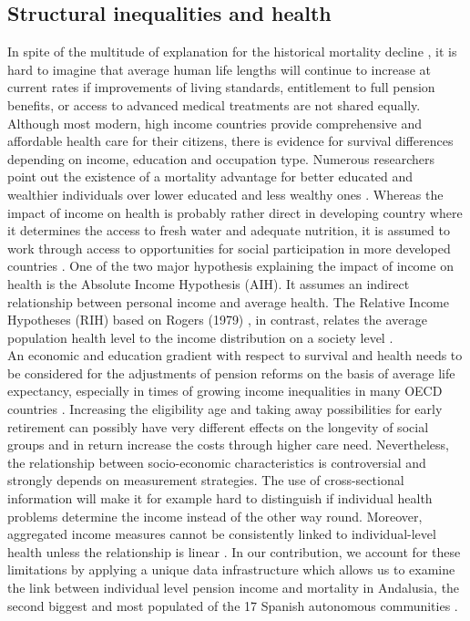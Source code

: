 \documentclass[a4paper,10pt,oneside,english]{article}
\begin{document}
\subsection*{\textsf{Structural inequalities and health}}
In spite of the multitude of explanation for the historical mortality decline \citep{riley2001rising}, it is hard to imagine that average human life lengths will continue to increase at current rates if improvements of living standards, entitlement to full pension benefits, or access to advanced medical treatments are not shared equally. Although most modern, high income countries provide comprehensive and affordable health care for their citizens, there is evidence for survival differences depending on income, education and occupation type. Numerous researchers point out the existence of a mortality advantage for better educated and wealthier individuals over lower educated and less wealthy ones  \cite{RN214,RN26,RN28,RN29,mackenbach2008socioeconomic,RN70}. Whereas the impact of income on health is probably rather direct in developing country where it determines the access to fresh water and adequate nutrition, it is assumed to work through access to opportunities for social participation in more developed countries \cite{RN35,RN39,RN41}. One of the two major hypothesis explaining the impact of income on health is the Absolute Income Hypothesis (AIH). It assumes an indirect relationship between personal income and average health. The Relative Income Hypotheses (RIH) based on Rogers (1979) \cite{rodgers1979income}, in contrast, relates the average population health level to the income distribution on a society level \citep{RN2}.\\
An economic and education gradient with respect to survival and health needs to be considered for the adjustments of pension reforms on the basis of average life expectancy, especially in times of growing income inequalities in many OECD countries \cite{RN74,corak2013income,RN47}. Increasing the eligibility age and taking away possibilities for early retirement can possibly have very different effects on the longevity of social groups and in return increase the costs through higher care need. Nevertheless, the relationship between socio-economic characteristics is controversial and strongly depends on measurement strategies. The use of cross-sectional information will make it for example hard to distinguish if individual health problems determine the income instead of the other way round. Moreover, aggregated income measures cannot be consistently linked to individual-level health unless the relationship is linear \citep[cf.][]{RN49}. In our contribution, we account for these limitations by applying a unique data infrastructure which allows us to examine the link between individual level pension income and mortality in Andalusia, the second biggest and most populated of the 17 Spanish autonomous communities \citep{RN113}.\\
\end{document}
